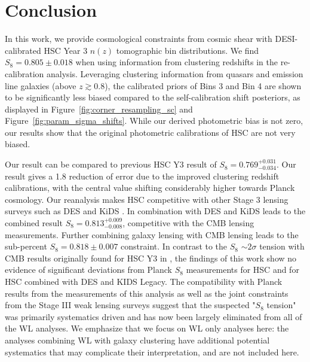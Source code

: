\section{Conclusion}
\label{sec:conclusion}

In this work, we provide cosmological constraints from cosmic shear with DESI-calibrated HSC Year 3 $n(z)$ tomographic bin distributions. We find $S_8=0.805\pm{0.018}$ when using information from clustering redshifts in the re-calibration analysis. Leveraging clustering information from quasars and emission line galaxies (above $z\gtrsim0.8$), the calibrated priors of Bins 3 and Bin 4 are shown to be significantly less biased compared to the self-calibration shift posteriors, as displayed in Figure~\ref{fig:corner_resampling_sc} and Figure~\ref{fig:param_sigma_shifts}. While our 
derived photometric bias is not zero, our results
show that the original photometric calibrations of HSC are not very biased. 

Our result can be compared to previous HSC Y3 result of $S_8=0.769^{+0.031}_{-0.034}$. Our result gives a 1.8 reduction of error due to the improved clustering redshift calibrations, with  
the central value shifting considerably higher towards Planck cosmology. 
Our reanalysis makes HSC competitive with other Stage 3 lensing surveys such as DES \cite{Amon2022CosmoShearDES, Secco2022CosmoShearDES} and KiDS \cite{Wright2025_KiDSLegacy}. In combination with DES and KiDS leads to the combined result $S_8=0.813^{+0.009}_{-0.008}$, competitive with the CMB lensing measurements. Further combining galaxy lensing with CMB lensing leads to the sub-percent $S_8=0.818\pm0.007$ constraint. In contrast to the $S_8$ $\sim2\sigma$ tension with CMB results originally found for HSC Y3 in \cite{Li2023_HSCY3_CosmicShear, Dalal2023CosmoShearHSC}, the findings of this work show no evidence of significant deviations from Planck $S_8$ measurements for HSC and for HSC combined with DES and KIDS Legacy. The compatibility with Planck results from the measurements of this analysis as well as the joint constraints from the Stage III weak lensing surveys suggest that the suspected "$S_8$ tension" \cite{DiValentino_S8_tension} was primarily systematics driven and has now been largely eliminated 
from all of the WL analyses. We emphasize
that we focus on WL only analyses here: the 
analyses combining WL with galaxy clustering 
have additional potential systematics that 
may complicate their interpretation, and are
not included here. 

